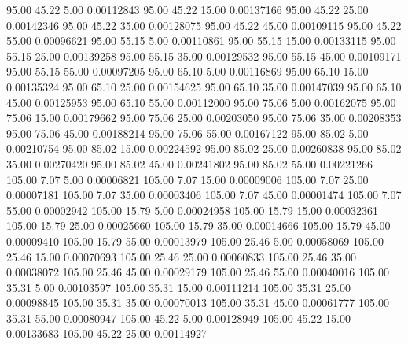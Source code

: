      95.00     45.22      5.00     0.00112843
     95.00     45.22     15.00     0.00137166
     95.00     45.22     25.00     0.00142346
     95.00     45.22     35.00     0.00128075
     95.00     45.22     45.00     0.00109115
     95.00     45.22     55.00     0.00096621
     95.00     55.15      5.00     0.00110861
     95.00     55.15     15.00     0.00133115
     95.00     55.15     25.00     0.00139258
     95.00     55.15     35.00     0.00129532
     95.00     55.15     45.00     0.00109171
     95.00     55.15     55.00     0.00097205
     95.00     65.10      5.00     0.00116869
     95.00     65.10     15.00     0.00135324
     95.00     65.10     25.00     0.00154625
     95.00     65.10     35.00     0.00147039
     95.00     65.10     45.00     0.00125953
     95.00     65.10     55.00     0.00112000
     95.00     75.06      5.00     0.00162075
     95.00     75.06     15.00     0.00179662
     95.00     75.06     25.00     0.00203050
     95.00     75.06     35.00     0.00208353
     95.00     75.06     45.00     0.00188214
     95.00     75.06     55.00     0.00167122
     95.00     85.02      5.00     0.00210754
     95.00     85.02     15.00     0.00224592
     95.00     85.02     25.00     0.00260838
     95.00     85.02     35.00     0.00270420
     95.00     85.02     45.00     0.00241802
     95.00     85.02     55.00     0.00221266
    105.00      7.07      5.00     0.00006821
    105.00      7.07     15.00     0.00009006
    105.00      7.07     25.00     0.00007181
    105.00      7.07     35.00     0.00003406
    105.00      7.07     45.00     0.00001474
    105.00      7.07     55.00     0.00002942
    105.00     15.79      5.00     0.00024958
    105.00     15.79     15.00     0.00032361
    105.00     15.79     25.00     0.00025660
    105.00     15.79     35.00     0.00014666
    105.00     15.79     45.00     0.00009410
    105.00     15.79     55.00     0.00013979
    105.00     25.46      5.00     0.00058069
    105.00     25.46     15.00     0.00070693
    105.00     25.46     25.00     0.00060833
    105.00     25.46     35.00     0.00038072
    105.00     25.46     45.00     0.00029179
    105.00     25.46     55.00     0.00040016
    105.00     35.31      5.00     0.00103597
    105.00     35.31     15.00     0.00111214
    105.00     35.31     25.00     0.00098845
    105.00     35.31     35.00     0.00070013
    105.00     35.31     45.00     0.00061777
    105.00     35.31     55.00     0.00080947
    105.00     45.22      5.00     0.00128949
    105.00     45.22     15.00     0.00133683
    105.00     45.22     25.00     0.00114927
